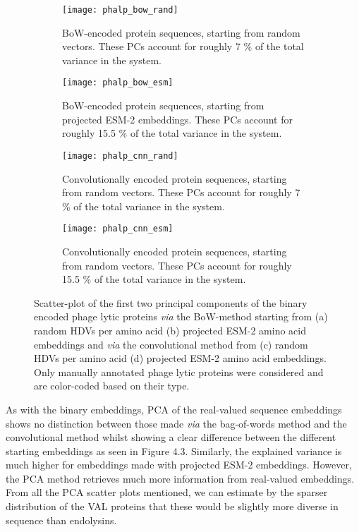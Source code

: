 \begin{figure}[ht!]
    \centering
    \begin{subfigure}{0.48\textwidth}
        \texttt{[image: phalp\_bow\_rand]}
        \caption{BoW-encoded protein sequences, starting from random vectors. These PCs account for roughly 7 \% of the total variance in the system.}
    \label{fig:phalpbowrand}
    \end{subfigure}
    \hfill
    \begin{subfigure}{0.48\textwidth}
        \texttt{[image: phalp\_bow\_esm]}
        \caption{BoW-encoded protein sequences, starting from projected ESM-2 embeddings. These PCs account for roughly 15.5 \% of the total variance in the system.}
    \label{fig:phalpbowesm}
    \end{subfigure}
    
    \begin{subfigure}{0.48\textwidth}
        \texttt{[image: phalp\_cnn\_rand]}
        \caption{Convolutionally encoded protein sequences, starting from random vectors. These PCs account for roughly 7 \% of the total variance in the system.}
    \label{fig:phalpcnnrand}
    \end{subfigure}
    \hfill
    \begin{subfigure}{0.48\textwidth}
        \texttt{[image: phalp\_cnn\_esm]}
        \caption{Convolutionally encoded protein sequences, starting from random vectors. These PCs account for roughly 15.5 \% of the total variance in the system.}
    \label{fig:phalpcnnesm}
    \end{subfigure}
    \caption{Scatter-plot of the first two principal components of the binary encoded phage lytic proteins \textit{via} the BoW-method starting from (a) random HDVs per amino acid (b) projected ESM-2 amino acid embeddings and \textit{via} the convolutional method from (c) random HDVs per amino acid (d) projected ESM-2 amino acid embeddings. Only manually annotated phage lytic proteins were considered and are color-coded based on their type.}
    \label{fig:phalp_emb}
\end{figure}

As with the binary embeddings, PCA of the real-valued sequence embeddings shows no distinction between those made \textit{via} the bag-of-words method and the convolutional method whilst showing a clear difference between the different starting embeddings as seen in Figure 4.3. Similarly, the explained variance is much higher for embeddings made with projected ESM-2 embeddings. However, the PCA method retrieves much more information from real-valued embeddings. From all the PCA scatter plots mentioned, we can estimate by the sparser distribution of the VAL proteins that these would be slightly more diverse in sequence than endolysins.

